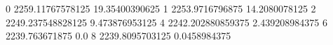 0 2259.11767578125 19.35400390625
1 2253.9716796875 14.2080078125
2 2249.237548828125 9.473876953125
4 2242.202880859375 2.439208984375
6 2239.763671875 0.0
8 2239.8095703125 0.0458984375
